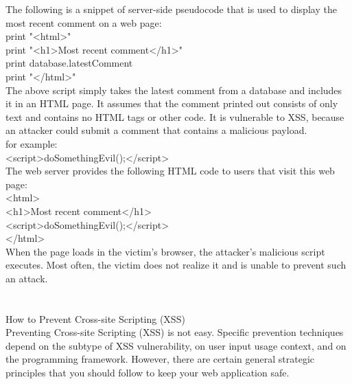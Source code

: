 \documentclass[a4paper, 12pt, fleqn]{article}
\begin{document}
\noindent
The following is a snippet of server-side pseudocode that is used to display
the most recent comment on a web page: \\
print "<html>" \\
print "<h1>Most recent comment</h1>" \\
print database.latestComment \\
print "</html>" \\

\noindent
The above script simply takes the latest comment from a database and
includes it in an HTML page. It assumes that the comment printed out
consists of only text and contains no HTML tags or other code. It is
vulnerable to XSS, because an attacker could submit a comment that
contains a malicious payload. \\
for example: \\
<script>doSomethingEvil();</script> \\

\noindent
The web server provides the following HTML code to users that visit this web page: \\
<html> \\
<h1>Most recent comment</h1> \\
<script>doSomethingEvil();</script> \\
</html> \\

\noindent
When the page loads in the victim’s browser, the attacker’s malicious script
executes. Most often, the victim does not realize it and is unable to prevent
such an attack.

\newpage
\section*{}

\noindent
How to Prevent Cross-site Scripting (XSS) \\
Preventing Cross-site Scripting (XSS) is not easy. Specific prevention
techniques depend on the subtype of XSS vulnerability, on user input
usage context, and on the programming framework. However, there are
certain general strategic principles that you should follow to keep your web
application safe.
\end{document}
